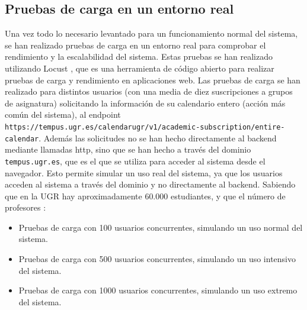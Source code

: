 \subsection{Pruebas de carga en un entorno real}
Una vez todo lo necesario levantado para un funcionamiento normal del sistema, se han realizado pruebas de carga en un entorno real para comprobar el rendimiento y la escalabilidad del sistema. Estas pruebas se han realizado utilizando Locust \cite{locust}, que es una herramienta de código abierto para realizar pruebas de carga y rendimiento en aplicaciones web.
\newline\newline
Las pruebas de carga se han realizado para distintos usuarios (con una media de diez suscripciones a grupos de asignatura) solicitando la información de su calendario entero (acción más común del sistema), al endpoint \texttt{https://tempus.ugr.es/calendarugr/v1/academic-subscription/entire-calendar}.\newline
Además las solicitudes no se han hecho directamente al backend mediante llamadas http, sino que se han hecho a través del dominio \texttt{tempus.ugr.es}, que es el que se utiliza para acceder al sistema desde el navegador. Esto permite simular un uso real del sistema, ya que los usuarios acceden al sistema a través del dominio y no directamente al backend.
\newline
Sabiendo que en la UGR hay aproximadamente 60.000 estudiantes, y que el número de profesores :
\begin{itemize}
    \item Pruebas de carga con 100 usuarios concurrentes, simulando un uso normal del sistema.
    \item Pruebas de carga con 500 usuarios concurrentes, simulando un uso intensivo del sistema.
    \item Pruebas de carga con 1000 usuarios concurrentes, simulando un uso extremo del sistema.
\end{itemize}

